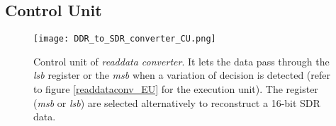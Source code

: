 \documentclass[10pt, english, a4paper, titlepage, oneside]{book}
\begin{document}
\subsection{Control Unit} \label{readdataconv_CU}
\vspace{2mm}
\begin{figure}[H]
    \centering
    \captionsetup{width=15cm}
    \texttt{[image: DDR\_to\_SDR\_converter\_CU.png]}
    \vspace{4mm}
    \caption{\centering Control unit of \textit{readdata converter}. It lets the data pass through the \textit{lsb} register or the \textit{msb} when a variation of decision is detected (refer to figure \ref{readdataconv_EU} for the execution unit). The register (\textit{msb} or \textit{lsb}) are selected alternatively to reconstruct a 16-bit SDR data.}
    \label{DDR_to_SDR_converter_CU}
\end{figure}
\vspace{6mm}
\end{document}
